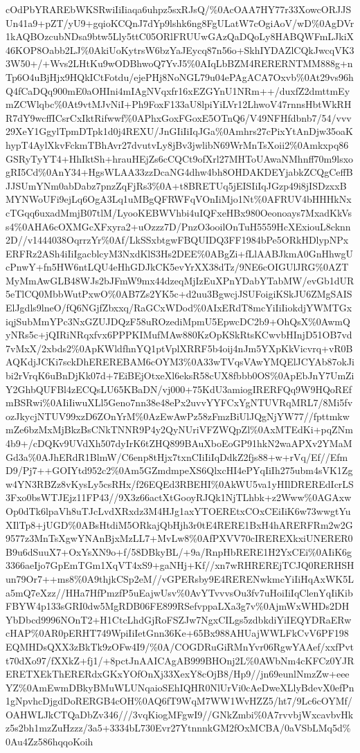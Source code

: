 \documentclass[]{article}
\begin{document}
cOdPbYRAREbWKSRwiIiIiaqa6uhpz5sxRJsQ/\%0AcOAA7HY77r33XowcORJJSUn41a9+pZT/yU9+gqioKCQnJ7dYp9lshk6ng8FgULatW7cOgiAoV/wD\%0AgDVr1kAQBOzcubNDsa9btw5Lly5ttC05ORlFRUUwGAzQaDQoLy8HABQWFmLJkiX46KOP8Oabb2LJ\%0AkiUoKytrsW6bzYaJEycq87n56o+SkhIYDAZlCQkJwcqVK33W50+/+Wvs2LHtKu9wODBhwoQ7YvJ5\%0AIqLbBZM4RERERNTMM888g+nTp6O4uBjHjx9HQkICtFotdu/ejePHj8NoNGL79u04ePAgACA7Oxvb\%0At29vs96hQ4fCaDQq900mE0aOHIni4mIAgNVqxfr16xEZGYnU1NRm++/duxfZ2dmttmEymZCWlqbc\%0At9vtMJvNiI+Ph9FoxF133aU8lpiYiLVr12LhwoV47rnnsHbtWkRHR7dY9wcffICsrCxIktRifwwf\%0APhxGoxFGoxE5OTnQ6/V49NFHfdbnb7/54/vvv29XeY1GgylTpmDTpk1d0j4REXU/JnGIiIiIqJGa\%0Amhrs27cPixYtAnDjw35oaKhypT4AylXkvFckmTBhAvr27dvutvLy8jBv3jwlibN69WrMnTsXoii2\%0Amkxpq86GSRyTyYT4+HhIktSh+hrauHEjZs6cCQCt9ofXrl27MHToUAwaNMhnff70m9lsxogRI5Cd\%0AnY34+HgsWLAA33zzDcaNG4dhw4bh8OHDAKDEYjabkZCQgCeffBJJSUmYNm0abDabz7pnzZqFjRs3\%0A+t8BRETUq5jEISIiIqJGzp49i8jISDzxxBMYNWoUFi9ejLq6OgA3Lq1uMBgQFRWFqVOnIiMjo1Nt\%0AFRUV4bHHHkNxcTGqq6uxadMmjB07tlM/LyooKEBWVhbi4uIQFxeHBx980Oeonoays7MxadKkVss4\%0AHA6cOXMGcXFxyra2+uOzzz7D/PnzO3ooilOnTuH5559HcXExiouL8cknn2D//v1444038OqrrzYr\%0Af/LkSSxbtgwFBQUIDQ3FF1984bPe5ORkHDlypNPxERFRz2ASh4iIiIgacblcyM3NxdKlS3Hs2DEE\%0ABgZi+fLlAABJkmA0GnHhwgUcPnwY+fn5HW6ntLQU4eHhGDJkCK5evYrXX38dTz/9NE6cOIGUlJRG\%0AZTMyMmAwGLB48WJs2bJFmW9mx44dzeqMjIzEuXPnYDabYTabMW/evGb1dUR5eTlCQ0MbbWutPxwO\%0AB7Zs2YK5c+d2uu3BgwcjJSUFoigiKSkJU6ZMgSAISElJgdls9lneO/fQ6NGjfZbxxq/RaGCxWDod\%0AIxERdT8mcYiIiIiokdjYWMTGxiqjSubMmYPc3NxGZUJDQzF58uROzediMpmU5EpwcDC2b9+OhQsX\%0AwmQyNRs5c+jQIRiNRqxfvx6PPPKIMufMAw880KzOpKSkRtsKCwvbHInjD51OB7vd7vMxX/2xbds2\%0ApKWldfhnYQ1ptVplXRRF5b4oij4nJm5YXpKkVicvrq+vR0BAQKdjJCKi7sckDhEREREBAM6cOYM3\%0A33wTVqsVAwYMQElJCYAb87okJibi2rVrqK6uBnDjKk07d+7EiBEjOtxeXl6eksR58cUX8fbbb0OS\%0ApEbJnY7UmZiY2GhbQUFBl4zECQsLU65KBaDN/vj000+75KdU3amiogIRERFQq9W9HQoREfmBSRwi\%0AIiIiwuXLl5Geno7nn38e48ePx2uvvYYFCxYgNTUVRqMRL7/8Mi5fvozJkycjNTUV99xzD6ZOnYrM\%0AzEwAwPz58zFmzBiUlJQgNjYW77//fpttmkwmZe6bzMxMjBkzBsCNkTNNR9P4y2QyNUriVFZWQpZl\%0AxMTEdKi+pqZNm4b9+/cDQKv9UVdXh507dyIrK6tZHQ899BAuXboEoGP91hkN2waAPXv2YMaMGd3a\%0AJhERdR1BlmW/C6enp8tHjx7txnCIiIiIqDdkZ2fjs88+w+rVq/Ef//EfmD9/Pj7++GOIYtd952c2\%0Am5GZmdmpeXS6QlxcHI4ePYqIiIh275ubm4sVK1Zgw4YN3RBZz8vKysLy5csRHx/f26EQEd3RBEHI\%0AkWU5va1yHIlDREREdIcrLS3Fxo0bsWTJEjz11FP43//9X3z66actXtGooyRJQk1NjTLhbk+z2Www\%0AGAxwOp0dTk6lpaVh8uTJcLvdXRxdz3M4HJg1axYTOEREtxCOxCEiIiK6w73wwgtYuXIlTp8+jUGD\%0ABsHtdiM5ORkajQbHjh3r0tE4RERE1BxH4hARERFRm2w2G9577z3MnTsXgwYNAnBjxMzLL7+MvLw8\%0AfPXVV70cIREREXkxiUNERER0B9u6dSuuX7+OxYsXN9o+f/58DBkyBL/+9a/RnpHbRERE1H2YxCEi\%0AIiK6g3366aeIjo7GpEmTGm1XqVT4xS9+gaNHj+Kf//xn7wRHREREjTCJQ0RERHSHun79Or7++ms8\%0A9thjkCSp2eM//vGPERsby9E4RERENwkmcYiIiHqAxWK5La5mQ7eXzz//HHa7HfPmzfP5uEajwUsv\%0AvYTvvvsOu3fv7uHoiIiIqClenYqIiKibFBYW4p133sGRI0dw5MgRDB06FE899RSefvppaLXa3g7v\%0AjmWxWHDs2DHYbDbcd9996NOnT2+H1CtcLhdGjRoFSZJw7NgxCILgs5zdbkdiYiIEQYDRaERwcHAP\%0AR0pERHT749WpiIiIetGnn36Ke+65Bx988AHUajWWLFkCvV6PF198EQMHDsQXX3zBkTk9zOFw4I9/\%0A/COGDRuGiRMnYvr06RgwYAAef/xxfPvtt70dXo97/fXXkZ+fj1/+8pctJnAAICAgAB999BHOnj2L\%0AWbNm4cKFCz0YJRERETXEkThERERdxGKxYOfOnXj33XexY8cOjB8/Hp9//jn69eunlNmzZw+eeeYZ\%0AmEwmDBkyBMuWLUNqaioSEhIQHR0NlUrVi0cAeDweXLlyBdevX0efPn1gNpvhcDjgdDoRERGB4cOH\%0AQ6fT9WqM7WW1WvHZZ5/ht7/9Lc6cOYMf/OAHWLJkCTQaDbZv346///3vqKiogMFgwI9//GNkZmbi\%0A7rvvbjWxcavbvHkz5s2bh1mzZuHzzz/3a5+3334bL730Evr27YtnnnkGM2fOxMCBA/0aVSbLMq5d\%0Au4Zz586hqqoKoih
\end{document}
